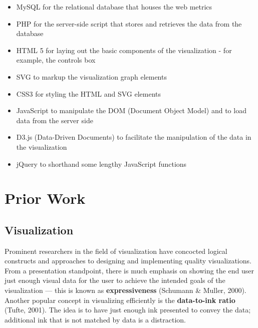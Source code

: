 \documentclass[12pt]{article}
\begin{document}
\begin{itemize}
\item MySQL for the relational database that houses the web metrics
\item PHP for the server-side script that stores and retrieves the data from the database
\item HTML 5 for laying out the basic components of the visualization - for example, the controls box
\item SVG to markup the visualization graph elements
\item CSS3 for styling the HTML and SVG elements
\item JavaScript to manipulate the DOM (Document Object Model) and to load data from the server side
\item D3.js (Data-Driven Documents) to facilitate the manipulation of the data in the visualization
\item jQuery to shorthand some lengthy JavaScript functions
\end{itemize}

\fi


\vfill

\section{Prior Work}
\subsection{Visualization}
Prominent researchers in the field of visualization have concocted logical constructs and approaches to designing and implementing quality visualizations. From a presentation standpoint, there is much emphasis on showing the end user just enough visual data for the user to achieve the intended goals of the visualization --- this is known as \textbf{expressiveness} (Schumann \& Muller, 2000). Another popular concept in visualizing efficiently is the \textbf{data-to-ink ratio} (Tufte, 2001). The idea is to have just enough ink presented to convey the data; additional ink that is not matched by data is a distraction. 
\end{document}
